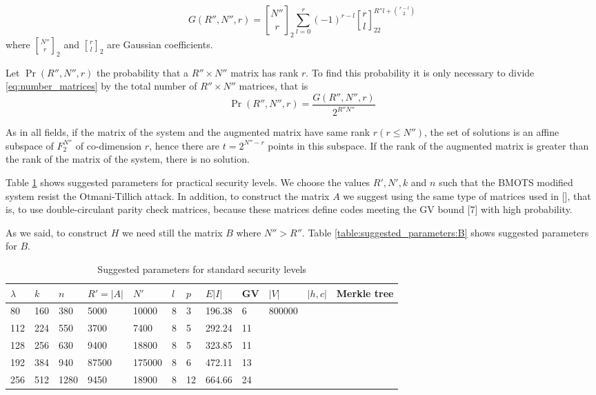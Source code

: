 \begin{equation}
G(R'',N'',r) = {N'' \brack r}_2\sum_{l=0}^{r}(-1)^{r-l}{r \brack l}_22^{R''l+{r-l \choose 2} }
\label{eq:number_matrices}
\end{equation}
where ${N'' \brack r}_2$ and ${r \brack l}_2$ are Gaussian coefficients.

Let $\Pr(R'',N'',r)$ the probability that a $R''\times N''$ matrix has rank $r$. To find this probability it is only necessary to divide \eqref{eq:number_matrices} by the total number of $R''\times N''$ matrices, that is 
\begin{equation}
\Pr(R'',N'',r) = \dfrac{G(R'',N'',r)}{2^{R''N''}}   
\end{equation}


As in all fields, if the matrix of the system and the augmented matrix have same rank $r(r\leq N'')$, the set of solutions is an affine subspace of $F^{N''}_2$ of co-dimension $r$, hence there are $t=2^{N''-r}$ points in this subspace. If the rank of the augmented matrix is greater than the rank of the matrix of the system, there is no solution. 

Table \ref{table:suggested_parameters} shows suggested parameters for practical security levels. We choose the values $R', N', k$ and $n$ such that the BMOTS modified system resist the Otmani-Tillich attack. In addition, to construct the matrix $A$ we suggest using the same type of matrices used in [], that is, to use double-circulant parity check matrices, because these matrices define codes meeting the GV bound [7] with high probability. 

As we said, to construct $H$ we need still the matrix $B$ where $N''>R''$. Table \ref{table:suggested_parameters:B} shows suggested parameters for $B$. 


\begin{table}[]
\centering
\caption{Suggested parameters for standard security levels}
\label{table:suggested_parameters}
\begin{tabular}{|l|l|l|l|l|l|l|l|l|l|l|l|}
\hline
$\lambda$ & $k$ & $n$ & $R'=|A|$ & $N'$    & $l$ & $p$ & $E{|I|}$ & GV & $|V|$ & $|h,c|$ & Merkle tree \\ \hline
80        & 160 & 380   & 5000    & 10000  & 8   & 3   & 196.38   & 6  &  800000  &       &             \\ \hline
112       & 224 & 550   & 3700    & 7400   & 8   & 5   & 292.24   & 11 &     &       &             \\ \hline
128       & 256 & 630   & 9400    & 18800  & 8   & 5   & 323.85   & 11 &     &       &             \\ \hline
192       & 384 & 940   & 87500   & 175000 & 8   & 6   & 472.11   & 13 &     &       &             \\ \hline
256       & 512 & 1280  & 9450    & 18900  & 8   & 12  & 664.66   & 24 &     &       &             \\ \hline
\end{tabular}
\end{table}

